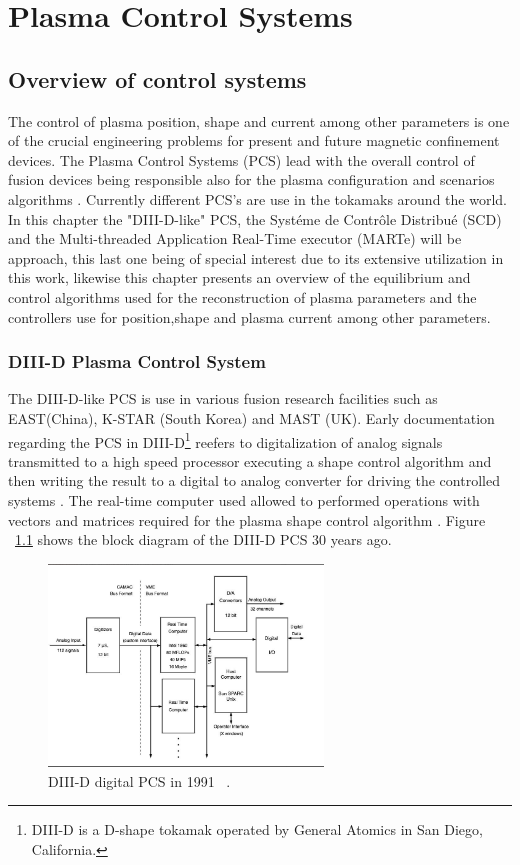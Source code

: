 \chapter{Plasma Control Systems}

\section{Overview of control systems}
The control of  plasma position, shape and current among other parameters is one of the crucial engineering problems for present and future magnetic confinement devices. The Plasma Control Systems (PCS) lead with the overall control of  fusion devices being responsible also for the  plasma configuration and scenarios algorithms \cite[Chapter~8]{PCS_2018}. Currently different PCS's are use in the tokamaks around the world. In this chapter the "DIII-D-like" PCS, the Syst\'eme de Contr\^ole Distribu\'e (SCD) and the Multi-threaded Application Real-Time executor (MARTe) will be approach, this last one being of special interest due to its extensive utilization in this work, likewise this chapter presents an overview of the equilibrium and control algorithms used for the reconstruction of plasma parameters and the controllers use for position,shape and plasma current among other parameters.

\subsection{DIII-D Plasma Control System}  

The DIII-D-like PCS is use in various fusion research facilities such as EAST(China), K-STAR (South Korea) and MAST (UK). Early documentation regarding the PCS in DIII-D\footnote{DIII-D is a D-shape tokamak operated by General Atomics in San Diego, California. } reefers to digitalization of analog signals transmitted to a high speed processor executing a shape control algorithm and then writing the result to a digital to analog converter for driving the controlled systems . The real-time computer used allowed to performed operations with vectors and matrices required for the plasma shape control algorithm \cite{DIIDcontrol}. Figure ~\ref{DIII1991} shows the block diagram of the DIII-D PCS 30 years ago.
\smallskip

\begin{figure}[htbp]
	\centering
	\includegraphics[width=0.65\textwidth]{Chp2/DIIDPCS_old.png}
	\caption{\label{DIII1991} DIII-D digital PCS in 1991 ~\cite{DIIDcontrol}.  }
\end{figure}

